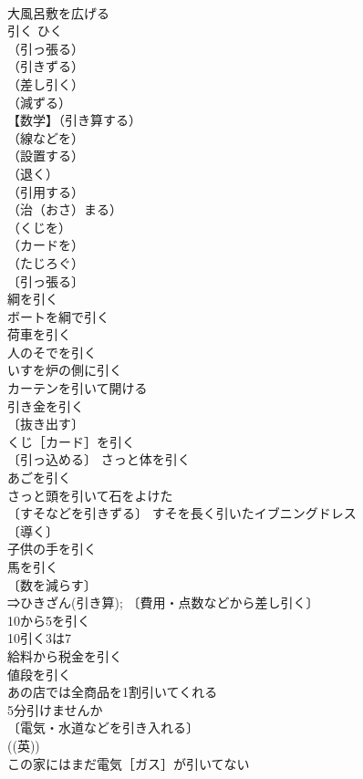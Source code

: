 \documentclass[8pt]{extreport}
\begin{document}
\begin{CJK}{UTF8}{min}
\\	大風呂敷を広げる 
\\	引く	ひく	
\\	（引っ張る）
\\	（引きずる）
\\	（差し引く）
\\	（減ずる）
\\	【数学】（引き算する）
\\	（線などを）
\\	（設置する）
\\	（退く）
\\	（引用する）
\\	（治（おさ）まる）
\\	（くじを）
\\	（カードを）
\\	（たじろぐ）
\\	〔引っ張る〕
\\	綱を引く 
\\	ボートを綱で引く 
\\	荷車を引く 
\\	人のそでを引く 
\\	いすを炉の側に引く 
\\	カーテンを引いて開ける 
\\	引き金を引く 
\\	〔抜き出す〕
\\	くじ［カード］を引く 
\\	〔引っ込める〕 さっと体を引く 
\\	あごを引く 
\\	さっと頭を引いて石をよけた 
\\	〔すそなどを引きずる〕 すそを長く引いたイブニングドレス 
\\	〔導く〕
\\	子供の手を引く 
\\	馬を引く 
\\	〔数を減らす〕
\\	⇒ひきざん(引き算); 〔費用・点数などから差し引く〕
\\	10から5を引く 
\\	10引く3は7 
\\	給料から税金を引く 
\\	値段を引く 
\\	あの店では全商品を1割引いてくれる 
\\	5分引けませんか 
\\	〔電気・水道などを引き入れる〕
\\	((英)) 
\\	この家にはまだ電気［ガス］が引いてない 

\end{CJK}
\end{document}
